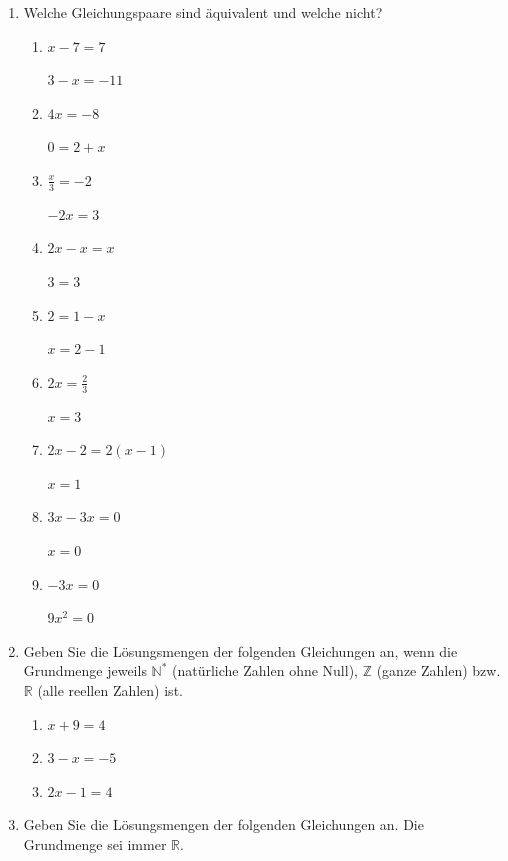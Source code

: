\documentclass[%
11pt,%
twoside,%
titlepage,%
german,%
]{scrartcl}
\begin{document}
\begin{enumerate}
\item Welche Gleichungspaare sind \"aquivalent und welche nicht?
  \begin{enumerate}
  \item \parbox{0.45\columnwidth}{$\displaystyle x-7=7$} \parbox{0.35\columnwidth}{$\displaystyle 3-x=-11$}
  \item \parbox{0.45\columnwidth}{$\displaystyle 4x=-8$} \parbox{0.35\columnwidth}{$\displaystyle 0=2+x$}
  \item \parbox{0.45\columnwidth}{$\displaystyle \frac{x}{3}=-2$} \parbox{0.35\columnwidth}{$\displaystyle -2x=3$}
  \item \parbox{0.45\columnwidth}{$\displaystyle 2x-x=x$} \parbox{0.35\columnwidth}{$\displaystyle 3=3$}
  \item \parbox{0.45\columnwidth}{$\displaystyle 2=1-x$} \parbox{0.35\columnwidth}{$\displaystyle x=2-1$}
  \item \parbox{0.45\columnwidth}{$\displaystyle 2x=\frac{2}{3}$} \parbox{0.35\columnwidth}{$\displaystyle x=3$}
  \item \parbox{0.45\columnwidth}{$\displaystyle 2x-2=2(x-1)$} \parbox{0.35\columnwidth}{$\displaystyle x=1$}
  \item \parbox{0.45\columnwidth}{$\displaystyle 3x-3x=0$} \parbox{0.35\columnwidth}{$\displaystyle x=0$}
  \item \parbox{0.45\columnwidth}{$\displaystyle -3x=0$} \parbox{0.35\columnwidth}{$\displaystyle 9x^2=0$}
  \end{enumerate}

\item Geben Sie die L\"osungsmengen der folgenden Gleichungen an, wenn die Grundmenge jeweils $\mathbb{N^*}$ (nat\"urliche Zahlen ohne Null), $\mathbb{Z}$ (ganze Zahlen) bzw. $\mathbb{R}$ (alle reellen Zahlen) ist.
  \begin{enumerate}
  \item $\displaystyle x+9=4$
  \item $\displaystyle 3-x=-5$
  \item $\displaystyle 2x-1=4$
  \end{enumerate}

\item Geben Sie die L\"osungsmengen der folgenden Gleichungen an. Die Grundmenge sei immer $\mathbb{R}$.


\end{enumerate}
\end{document}
